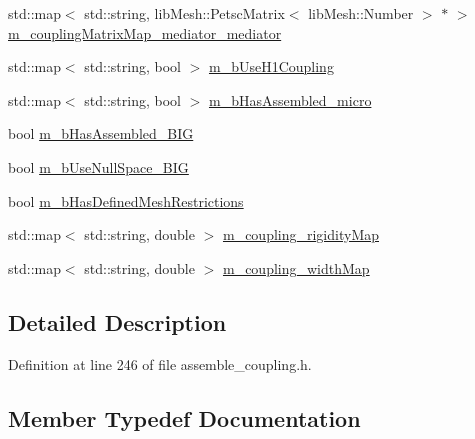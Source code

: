 \begin{DoxyCompactItemize}
std\+::map$<$ std\+::string, lib\+Mesh\+::\+Petsc\+Matrix$<$ lib\+Mesh\+::\+Number $>$ $\ast$ $>$ \hyperlink{classcarl_1_1assemble__coupling__matrices_a1a838735ff335cdf1d24403ceab3b896}{m\+\_\+coupling\+Matrix\+Map\+\_\+mediator\+\_\+mediator}
\item 
std\+::map$<$ std\+::string, bool $>$ \hyperlink{classcarl_1_1assemble__coupling__matrices_a9e3bf058bd10aacb63ebbab34fe37628}{m\+\_\+b\+Use\+H1\+Coupling}
\item 
std\+::map$<$ std\+::string, bool $>$ \hyperlink{classcarl_1_1assemble__coupling__matrices_a84f7dc1f435eabc152f0df50d7650269}{m\+\_\+b\+Has\+Assembled\+\_\+micro}
\item 
bool \hyperlink{classcarl_1_1assemble__coupling__matrices_a3fa42a0aa231b0feaa3b27a6f0fb11e1}{m\+\_\+b\+Has\+Assembled\+\_\+\+B\+I\+G}
\item 
bool \hyperlink{classcarl_1_1assemble__coupling__matrices_a96baf5080d2887764b52d64d56dffce2}{m\+\_\+b\+Use\+Null\+Space\+\_\+\+B\+I\+G}
\item 
bool \hyperlink{classcarl_1_1assemble__coupling__matrices_aaed7135f088376664521b650c2b25fbd}{m\+\_\+b\+Has\+Defined\+Mesh\+Restrictions}
\item 
std\+::map$<$ std\+::string, double $>$ \hyperlink{classcarl_1_1assemble__coupling__matrices_a2133e2d98a47de9569137f31d69c58ee}{m\+\_\+coupling\+\_\+rigidity\+Map}
\item 
std\+::map$<$ std\+::string, double $>$ \hyperlink{classcarl_1_1assemble__coupling__matrices_a72f1024c5634b4e31b8583ee60bb14bc}{m\+\_\+coupling\+\_\+width\+Map}
\end{DoxyCompactItemize}


\subsection{Detailed Description}


Definition at line 246 of file assemble\+\_\+coupling.\+h.



\subsection{Member Typedef Documentation}
\hypertarget{classcarl_1_1assemble__coupling__matrices_a2c14330f6dd8399037d78458bb27b4f4}{}
